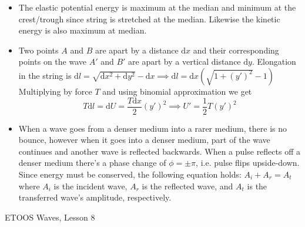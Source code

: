\documentclass{scrartcl}
\begin{document}
\begin{itemize}
        \item The elastic potential energy is maximum at the median and minimum at the crest/trough since string is stretched at the median. Likewise the kinetic energy is also maximum at median.
        \item Two points $A$ and $B$ are apart by a distance $\mathrm dx$ and their corresponding points on the wave $A'$ and $B'$ are apart by a vertical distance $\mathrm dy$. Elongation in the string is $\mathrm dl=\sqrt{\mathrm dx^2+\mathrm dy^2}-\mathrm dx\implies\mathrm dl=\mathrm dx\left(\sqrt{1+\left(y'\right)^2}-1\right)$ Multiplying by force $T$ and using binomial approximation we get \[T\mathrm dl=\mathrm dU=\frac{T\mathrm dx}2\left(y'\right)^2\implies U'=\frac12T(y')^2\]
        \item When a wave goes from a denser medium into a rarer medium, there is no bounce, however when it goes into a denser medium, part of the wave continues and another wave is reflected backwards. When a pulse reflects off a denser medium there's a phase change of $\phi=\pm\pi$, i.e. pulse flips upside-down. Since energy must be conserved, the following equation holds: $A_i+A_r=A_t$ where $A_i$ is the incident wave, $A_r$ is the reflected wave, and $A_t$ is the transferred wave's amplitude, respectively.
    \end{itemize}
    ETOOS Waves, Lesson 8
\end{document}
